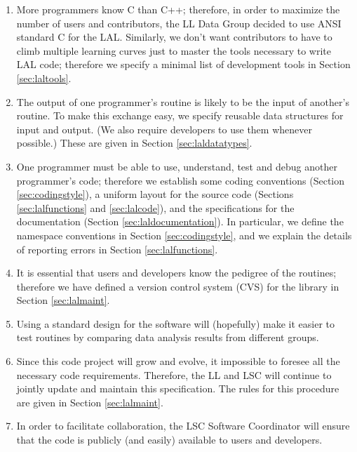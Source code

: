 \documentclass[]{ligodcc}
\begin{document}
\begin{enumerate}
\item 
More programmers know C than C++; therefore, in order to
maximize the  number of users and  contributors, the  LL Data Group
decided to use ANSI standard C  for the LAL. Similarly, we don't
want contributors to have to climb multiple learning curves just to
master the tools necessary to write LAL code; therefore we specify a
minimal list of development tools in Section \ref{sec:laltools}.

\item
The output of one programmer's routine is likely to be the
input of another's  routine. To make this exchange easy,  we
specify reusable data structures for input and output. (We also
require developers to use them whenever possible.) These are given in
Section  \ref{sec:laldatatypes}.

\item
One programmer must be able to use, understand, test and debug another
programmer's code; therefore we establish some coding conventions
(Section \ref{sec:codingstyle}),  a uniform layout for the source code
(Sections \ref{sec:lalfunctions} and \ref{sec:lalcode}),  and the
specifications for the documentation (Section
\ref{sec:laldocumentation}). In particular, we
define the  namespace conventions  in Section \ref{sec:codingstyle}, 
and  we explain the
details of  reporting errors in Section \ref{sec:lalfunctions}. 

\item
It is essential that users and developers know the pedigree of
the routines; therefore we have defined a version
control system (CVS) for the library in Section \ref{sec:lalmaint}.  

\item
Using a standard design for the software will (hopefully) make it
easier to test routines by comparing data analysis results from
different groups.
	
\item
Since this code project will grow and evolve, it impossible to foresee
all the necessary code requirements. Therefore, the LL and LSC will
continue to jointly update and maintain this specification. The rules
for this procedure are given in Section \ref{sec:lalmaint}.

\item
In order to facilitate collaboration, the LSC Software
Coordinator will ensure that  the code is publicly (and easily)
available to users and developers.

\end{enumerate}
\end{document}
